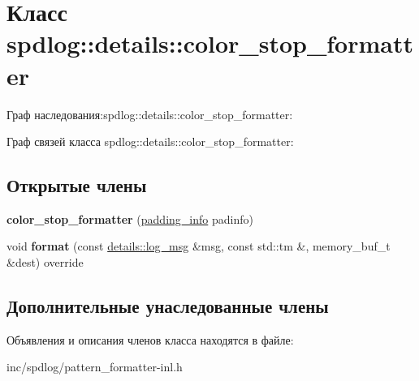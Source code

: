 \hypertarget{classspdlog_1_1details_1_1color__stop__formatter}{}\section{Класс spdlog\+:\+:details\+:\+:color\+\_\+stop\+\_\+formatter}
\label{classspdlog_1_1details_1_1color__stop__formatter}


Граф наследования\+:spdlog\+:\+:details\+:\+:color\+\_\+stop\+\_\+formatter\+:


Граф связей класса spdlog\+:\+:details\+:\+:color\+\_\+stop\+\_\+formatter\+:
\subsection*{Открытые члены}
\begin{DoxyCompactItemize}
\item 
\mbox{\label{classspdlog_1_1details_1_1color__stop__formatter_ae91bec8b6dec2965b7406026925d1cdc}} 
{\bfseries color\+\_\+stop\+\_\+formatter} (\hyperlink{structspdlog_1_1details_1_1padding__info}{padding\+\_\+info} padinfo)
\item 
\mbox{\label{classspdlog_1_1details_1_1color__stop__formatter_a44951ad881623156402af9a6a8c1a4f6}} 
void {\bfseries format} (const \hyperlink{structspdlog_1_1details_1_1log__msg}{details\+::log\+\_\+msg} \&msg, const std\+::tm \&, memory\+\_\+buf\+\_\+t \&dest) override
\end{DoxyCompactItemize}
\subsection*{Дополнительные унаследованные члены}


Объявления и описания членов класса находятся в файле\+:\begin{DoxyCompactItemize}
\item 
inc/spdlog/pattern\+\_\+formatter-\/inl.\+h\end{DoxyCompactItemize}
